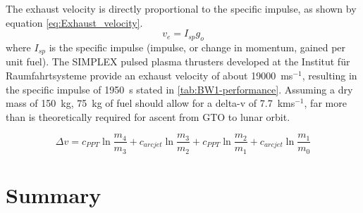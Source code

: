 The exhaust velocity is directly proportional to the specific impulse, as shown by equation \eqref{eq:Exhaust_velocity}.
\begin{equation}\label{eq:Exhaust_velocity}
v_{e}=I_{sp}g_{o}
\end{equation}
where $I_{sp}$ is the specific impulse (impulse, or change in momentum, gained per unit fuel). The SIMPLEX pulsed plasma thrusters developed at the Institut f\"{u}r Raumfahrtsysteme \parencite{Nawaz2008} provide an exhaust velocity of about 19000~ms$^{-1}$, resulting in the specific impulse of 1950~s stated in \autoref{tab:BW1-performance}. Assuming a dry mass of 150~kg, 75~kg of fuel should allow for a delta-v of 7.7~kms$^{-1}$, far more than is theoretically required for ascent from GTO to lunar orbit.

\begin{equation}
\Delta v= c_{PPT}\ln\frac{m_4}{m_3}+c_{arcjet}\ln\frac{m_3}{m_2}+c_{PPT}\ln\frac{m_2}{m_1}+c_{arcjet}\ln\frac{m_1}{m_0}
\end{equation}


\section{Summary} 

